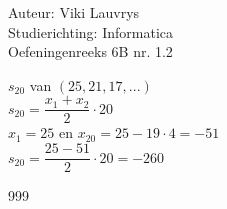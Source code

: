 \documentclass[a4paper]{article}
\begin{document}
  
\noindent \large Auteur: Viki	Lauvrys \\
\noindent \large Studierichting: Informatica\\
\noindent \large Oefeningenreeks 6B nr. 1.2\\

\medskip

\normalsize

$ s_{20} $ van $ (25,21,17,...) $ \\

$ s_{20} = \dfrac{x_1 + x_2}{2} \cdot 20 $ \\

$ x_1 = 25 $ en $ x_{20} = 25 - 19 \cdot 4 = -51 $ \\

$ s_{20} = \dfrac{25-51}{2} \cdot 20 = -260 $ \\

\begin{thebibliography}{999}
\end{thebibliography}
\end{document}
